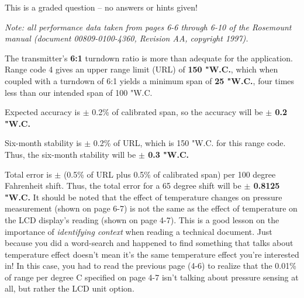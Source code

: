 
This is a graded question -- no answers or hints given!







{\it Note: all performance data taken from pages 6-6 through 6-10 of the Rosemount manual (document 00809-0100-4360, Revision AA, copyright 1997).}

\vskip 10pt

The transmitter's {\bf 6:1} turndown ratio is more than adequate for the application.  Range code 4 gives an upper range limit (URL) of {\bf 150 "W.C.}, which when coupled with a turndown of 6:1 yields a minimum span of {\bf 25 "W.C.}, four times less than our intended span of 100 "W.C.

\vskip 10pt

Expected accuracy is $\pm$ 0.2\% of calibrated span, so the accuracy will be {\bf $\pm$ 0.2 "W.C.}

\vskip 10pt

Six-month stability is $\pm$ 0.2\% of URL, which is 150 "W.C. for this range code.  Thus, the six-month stability will be {\bf $\pm$ 0.3 "W.C.}

\vskip 10pt

Total error is $\pm$ (0.5\% of URL plus 0.5\% of calibrated span) per 100 degree Fahrenheit shift.  Thus, the total error for a 65 degree shift will be {\bf $\pm$ 0.8125 "W.C.}  It should be noted that the effect of temperature changes on pressure measurement (shown on page 6-7) is not the same as the effect of temperature on the LCD display's reading (shown on page 4-7).  This is a good lesson on the importance of {\it identifying context} when reading a technical document.  Just because you did a word-search and happened to find something that talks about temperature effect doesn't mean it's the same temperature effect you're interested in!  In this case, you had to read the previous page (4-6) to realize that the 0.01\% of range per degree C specified on page 4-7 isn't talking about pressure sensing at all, but rather the LCD unit option.




